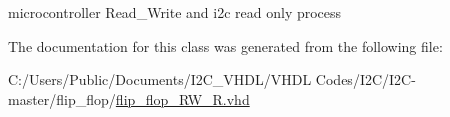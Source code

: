 microcontroller Read\+\_\+\+Write and i2c read only process 



The documentation for this class was generated from the following file\+:\begin{DoxyCompactItemize}
\item 
C\+:/\+Users/\+Public/\+Documents/\+I2\+C\+\_\+\+V\+H\+D\+L/\+V\+H\+D\+L Codes/\+I2\+C/\+I2\+C-\/master/flip\+\_\+flop/\hyperlink{flip__flop___r_w___r_8vhd}{flip\+\_\+flop\+\_\+\+R\+W\+\_\+\+R.\+vhd}\end{DoxyCompactItemize}
